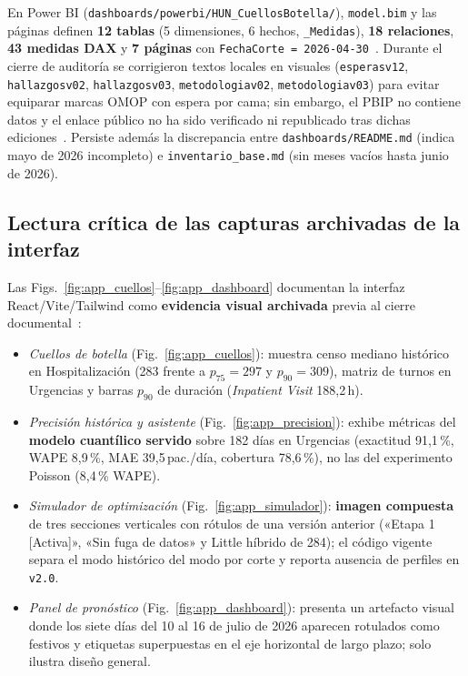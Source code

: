 En Power BI (\nolinkurl{dashboards/powerbi/HUN_CuellosBotella/}), \texttt{model.bim} y las páginas definen \textbf{12 tablas} (5 dimensiones, 6 hechos, \texttt{\_Medidas}), \textbf{18 relaciones}, \textbf{43 medidas DAX} y \textbf{7 páginas} con \texttt{FechaCorte = 2026-04-30}~\cite{mediflow2026pbip}. Durante el cierre de auditoría se corrigieron textos locales en visuales (\texttt{esperasv12}, \texttt{hallazgosv02}, \texttt{hallazgosv03}, \texttt{metodologiav02}, \texttt{metodologiav03}) para evitar equiparar marcas OMOP con espera por cama; sin embargo, el PBIP no contiene datos y el enlace público no ha sido verificado ni republicado tras dichas ediciones~\cite{mediflow2026auditoria}. Persiste además la discrepancia entre \texttt{dashboards/README.md} (indica mayo de 2026 incompleto) e \texttt{inventario\_base.md} (sin meses vacíos hasta junio de 2026).

\subsection{Lectura crítica de las capturas archivadas de la interfaz}

Las Figs.~\ref{fig:app_cuellos}--\ref{fig:app_dashboard} documentan la interfaz React/Vite/Tailwind como \textbf{evidencia visual archivada} previa al cierre documental~\cite{mediflow2026informe}:
\begin{itemize}[leftmargin=*,nosep]
\item \textit{Cuellos de botella} (Fig.~\ref{fig:app_cuellos}): muestra censo mediano histórico en Hospitalización (283 frente a $p_{75}=297$ y $p_{90}=309$), matriz de turnos en Urgencias y barras $p_{90}$ de duración (\textit{Inpatient Visit} 188,2\,h).
\item \textit{Precisión histórica y asistente} (Fig.~\ref{fig:app_precision}): exhibe métricas del \textbf{modelo cuantílico servido} sobre 182 días en Urgencias (exactitud 91,1\,\%, WAPE 8,9\,\%, MAE 39,5\,pac./día, cobertura 78,6\,\%), no las del experimento Poisson (8,4\,\% WAPE).
\item \textit{Simulador de optimización} (Fig.~\ref{fig:app_simulador}): \textbf{imagen compuesta} de tres secciones verticales con rótulos de una versión anterior («Etapa 1 [Activa]», «Sin fuga de datos» y Little híbrido de 284); el código vigente separa el modo histórico del modo por corte y reporta ausencia de perfiles en \texttt{v2.0}.
\item \textit{Panel de pronóstico} (Fig.~\ref{fig:app_dashboard}): presenta un artefacto visual donde los siete días del 10 al 16 de julio de 2026 aparecen rotulados como festivos y etiquetas superpuestas en el eje horizontal de largo plazo; solo ilustra diseño general.
\end{itemize}

